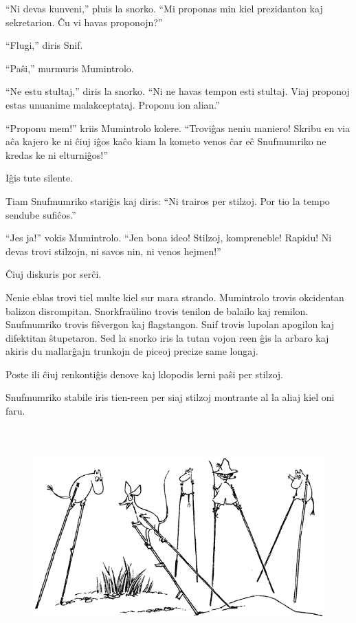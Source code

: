 ``Ni devas kunveni,'' pluis la snorko. ``Mi proponas min kiel prezidanton kaj sekretarion. Ĉu vi havas proponojn?''

``Flugi,'' diris Snif.

``Paŝi,'' murmuris Mumintrolo.

``Ne estu stultaj,'' diris la snorko. ``Ni ne havas tempon esti stultaj. Viaj proponoj estas unuanime malakceptataj. Proponu ion alian.''

``Proponu mem!'' kriis Mumintrolo kolere. ``Troviĝas neniu maniero! Skribu en via aĉa kajero ke ni ĉiuj iĝos kaĉo kiam la kometo venos ĉar eĉ Snufmumriko ne kredas ke ni elturniĝos!''

Iĝis tute silente.

Tiam Snufmumriko stariĝis kaj diris: ``Ni trairos per stilzoj. Por tio la tempo sendube sufiĉos.''

``Jes ja!'' vokis Mumintrolo. ``Jen bona ideo! Stilzoj, kompreneble! Rapidu! Ni devas trovi stilzojn, ni savos nin, ni venos hejmen!''

Ĉiuj diskuris por serĉi.

Nenie eblas trovi tiel multe kiel sur mara strando. Mumintrolo trovis okcidentan balizon disrompitan. Snorkfraŭlino trovis tenilon de balailo kaj remilon. Snufmumriko trovis fiŝvergon kaj flagstangon. Snif trovis lupolan apogilon kaj difektitan ŝtupetaron. Sed la snorko iris la tutan vojon reen ĝis la arbaro kaj akiris du mallarĝajn trunkojn de piceoj precize same longaj.

Poste ili ĉiuj renkontiĝis denove kaj klopodis lerni paŝi per stilzoj.

Snufmumriko stabile iris tien-reen per siaj stilzoj montrante al la aliaj kiel oni faru.

\begin{figure}[htbp]
\centering
\includegraphics[width=430pt,height=238pt]{7-3.png}
\caption{}
\label{7-3}
\end{figure}

